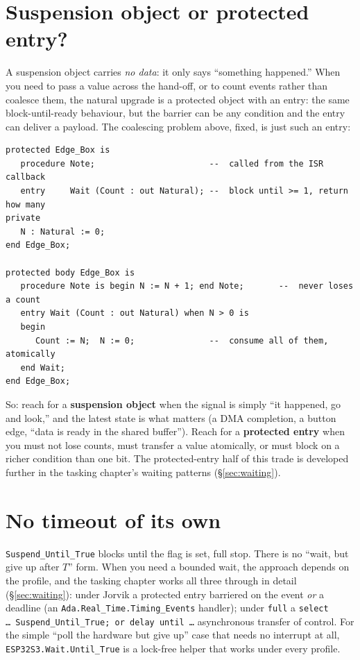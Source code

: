 \section{Suspension object or protected entry?}

A suspension object carries \emph{no data}: it only says ``something happened.''
When you need to pass a value across the hand-off, or to count events rather than
coalesce them, the natural upgrade is a protected object with an entry: the same
block-until-ready behaviour, but the barrier can be any condition and the entry can
deliver a payload. The coalescing problem above, fixed, is just such an entry:

\begin{lstlisting}
protected Edge_Box is
   procedure Note;                       --  called from the ISR callback
   entry     Wait (Count : out Natural); --  block until >= 1, return how many
private
   N : Natural := 0;
end Edge_Box;

protected body Edge_Box is
   procedure Note is begin N := N + 1; end Note;       --  never loses a count
   entry Wait (Count : out Natural) when N > 0 is
   begin
      Count := N;  N := 0;               --  consume all of them, atomically
   end Wait;
end Edge_Box;
\end{lstlisting}

So: reach for a \textbf{suspension object} when the signal is simply ``it happened,
go and look,'' and the latest state is what matters (a DMA completion, a button
edge, ``data is ready in the shared buffer''). Reach for a \textbf{protected entry}
when you must not lose counts, must transfer a value atomically, or must block on a
richer condition than one bit. The protected-entry half of this trade is developed
further in the tasking chapter's waiting patterns (\S\ref{sec:waiting}).

\section{No timeout of its own}

\texttt{Suspend\_Until\_True} blocks until the flag is set, full stop. There is no
``wait, but give up after $T$'' form. When you need a bounded wait, the approach
depends on the profile, and the tasking chapter works all three through in detail
(\S\ref{sec:waiting}): under Jorvik a protected entry barriered on the event
\emph{or} a deadline (an \texttt{Ada.Real\_Time.Timing\_Events} handler); under
\texttt{full} a \texttt{select \ldots\ Suspend\_Until\_True; or delay until \ldots}
asynchronous transfer of control. For the simple ``poll the hardware but give up''
case that needs no interrupt at all, \texttt{ESP32S3.Wait.Until\_True} is a
lock-free helper that works under every profile.

